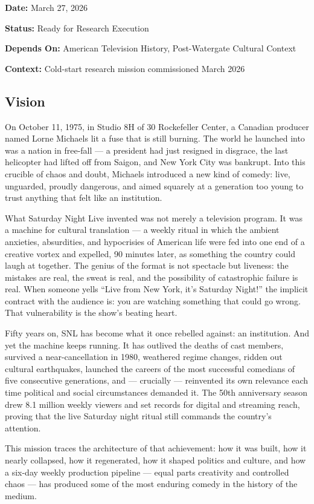 \documentclass[11pt,letterpaper]{article}
\newcommand{\metafield}[2]{\textbf{\sffamily #1} #2\par}
\begin{document}
\metafield{Date:}{March 27, 2026}
\metafield{Status:}{Ready for Research Execution}
\metafield{Depends On:}{American Television History, Post-Watergate Cultural Context}
\metafield{Context:}{Cold-start research mission commissioned March 2026}

\subsection{Vision}

On October 11, 1975, in Studio 8H of 30 Rockefeller Center, a Canadian producer named Lorne Michaels lit a fuse that is still burning. The world he launched into was a nation in free-fall --- a president had just resigned in disgrace, the last helicopter had lifted off from Saigon, and New York City was bankrupt. Into this crucible of chaos and doubt, Michaels introduced a new kind of comedy: live, unguarded, proudly dangerous, and aimed squarely at a generation too young to trust anything that felt like an institution.

What Saturday Night Live invented was not merely a television program. It was a machine for cultural translation --- a weekly ritual in which the ambient anxieties, absurdities, and hypocrisies of American life were fed into one end of a creative vortex and expelled, 90 minutes later, as something the country could laugh at together. The genius of the format is not spectacle but liveness: the mistakes are real, the sweat is real, and the possibility of catastrophic failure is real. When someone yells ``Live from New York, it's Saturday Night!'' the implicit contract with the audience is: you are watching something that could go wrong. That vulnerability is the show's beating heart.

Fifty years on, SNL has become what it once rebelled against: an institution. And yet the machine keeps running. It has outlived the deaths of cast members, survived a near-cancellation in 1980, weathered regime changes, ridden out cultural earthquakes, launched the careers of the most successful comedians of five consecutive generations, and --- crucially --- reinvented its own relevance each time political and social circumstances demanded it. The 50th anniversary season drew 8.1 million weekly viewers and set records for digital and streaming reach, proving that the live Saturday night ritual still commands the country's attention.

This mission traces the architecture of that achievement: how it was built, how it nearly collapsed, how it regenerated, how it shaped politics and culture, and how a six-day weekly production pipeline --- equal parts creativity and controlled chaos --- has produced some of the most enduring comedy in the history of the medium.
\end{document}
